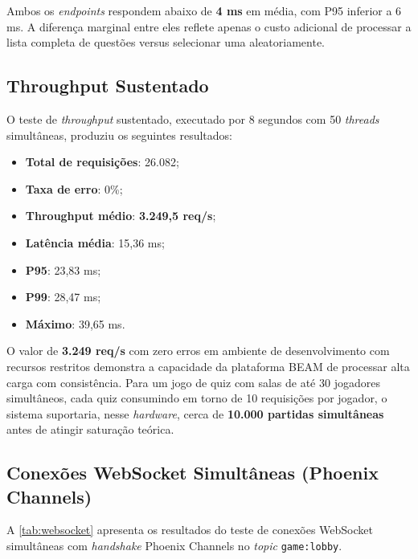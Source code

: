 \documentclass[
	12pt,
	openany,
	oneside,
	a4paper,
	english,
	brazil
]{abntex2}
\begin{document}
Ambos os \textit{endpoints} respondem abaixo de \textbf{4 ms} em média, com P95 inferior a 6 ms. A diferença marginal entre eles reflete apenas o custo adicional de processar a lista completa de questões versus selecionar uma aleatoriamente.

\subsection{Throughput Sustentado}

O teste de \textit{throughput} sustentado, executado por 8 segundos com 50 \textit{threads} simultâneas, produziu os seguintes resultados:

\begin{itemize}
  \item \textbf{Total de requisições}: 26.082;
  \item \textbf{Taxa de erro}: 0\%;
  \item \textbf{Throughput médio}: \textbf{3.249,5 req/s};
  \item \textbf{Latência média}: 15,36 ms;
  \item \textbf{P95}: 23,83 ms;
  \item \textbf{P99}: 28,47 ms;
  \item \textbf{Máximo}: 39,65 ms.
\end{itemize}

O valor de \textbf{3.249 req/s} com zero erros em ambiente de desenvolvimento com recursos restritos demonstra a capacidade da plataforma BEAM de processar alta carga com consistência. Para um jogo de quiz com salas de até 30 jogadores simultâneos, cada quiz consumindo em torno de 10 requisições por jogador, o sistema suportaria, nesse \textit{hardware}, cerca de \textbf{10.000 partidas simultâneas} antes de atingir saturação teórica.

\subsection{Conexões WebSocket Simultâneas (Phoenix Channels)}

A \autoref{tab:websocket} apresenta os resultados do teste de conexões WebSocket simultâneas com \textit{handshake} Phoenix Channels no \textit{topic} \texttt{game:lobby}.
\end{document}
